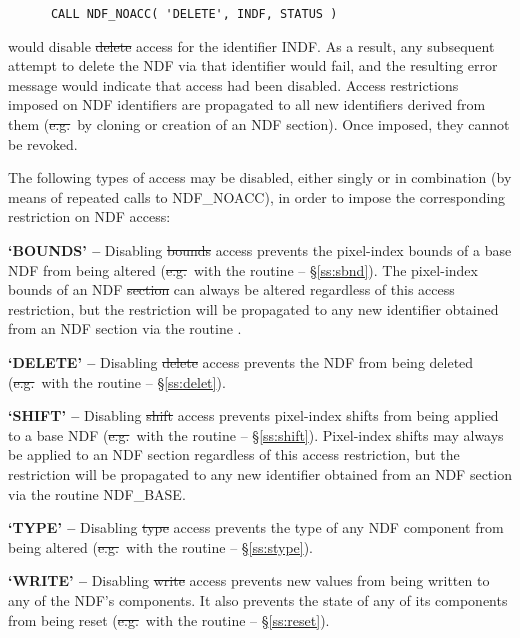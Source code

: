 \small
\begin{verbatim}
      CALL NDF_NOACC( 'DELETE', INDF, STATUS )
\end{verbatim}
\normalsize

would disable \st{delete\/} access for the identifier INDF.
As a result, any subsequent attempt to delete the NDF via that identifier
would fail, and the resulting error message would indicate that access had
been disabled. 
Access restrictions imposed on NDF identifiers are propagated to all new
identifiers derived from them (\st{e.g.}\ by cloning or creation of an NDF
section).
Once imposed, they cannot be revoked. 

The following types of access may be disabled, either singly or in
combination (by means of repeated calls to NDF\_NOACC), in order to impose
the corresponding restriction on NDF access: 

\begin{description}

\item{\bf `BOUNDS' --} Disabling \st{bounds\/} access prevents the
pixel-index bounds of a base NDF from being altered (\st{e.g.}\ with the
routine  -- \S\ref{ss:sbnd}). 
The pixel-index bounds of an NDF \st{section\/} can always be altered
regardless of this access restriction, but the restriction will be
propagated to any new identifier obtained from an NDF section via the
routine . 

\item{\bf `DELETE' --} Disabling \st{delete\/} access prevents the NDF from
being deleted (\st{e.g.}\ with the routine  -- \S\ref{ss:delet}).

\item{\bf `SHIFT' --} Disabling \st{shift\/} access prevents pixel-index
shifts from being applied to a base NDF (\st{e.g.}\ with the routine
 -- \S\ref{ss:shift}). 
Pixel-index shifts may always be applied to an NDF section regardless of
this access restriction, but the restriction will be propagated to any new
identifier obtained from an NDF section via the routine NDF\_BASE. 

\item{\bf `TYPE' --} Disabling \st{type\/} access prevents the type of any
NDF component from being altered (\st{e.g.}\ with the routine  --
\S\ref{ss:stype}). 

\item{\bf `WRITE' --} Disabling \st{write\/} access prevents new values from 
being written to any of the NDF's components.
It also prevents the state of any of its components from being reset
(\st{e.g.}\ with the routine  --
\S\ref{ss:reset}).  

\end{description}


